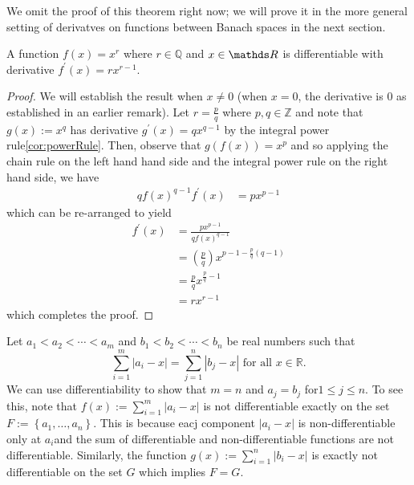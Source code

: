 We omit the proof of this theorem right now; we will prove it in the
more general setting of derivatves on functions between Banach spaces
in the next section.
\begin{prop}
\label{prop:rationalPowerRule}A function $f\left(x\right)=x^{r}$
where $r\in\mathds{Q}$ and $x\in\R$ is differentiable with derivative
$f^{\prime}\left(x\right)=rx^{r-1}.$
\end{prop}

\begin{proof}
We will establish the result when $x\neq0$ (when $x=0$, the derivative
is 0 as established in an earlier remark). Let $r=\frac{p}{q}$ where
$p,q\in\mathds{Z}$ and note that $g\left(x\right):=x^{q}$ has derivative
$g^{\prime}\left(x\right)=qx^{q-1}$ by the integral power rule\ref{cor:powerRule}.
Then, observe that $g\left(f\left(x\right)\right)=x^{p}$ and so applying
the chain rule on the left hand hand side and the integral power rule
on the right hand side, we have
\begin{align*}
qf\left(x\right)^{q-1}f^{\prime}\left(x\right) & =px^{p-1}
\end{align*}
which can be re-arranged to yield
\begin{align*}
f^{\prime}\left(x\right) & =\frac{px^{p-1}}{qf\left(x\right)^{q-1}}\\
 & =\left(\frac{p}{q}\right)x^{p-1-\frac{p}{q}\left(q-1\right)}\\
 & =\frac{p}{q}x^{\frac{p}{q}-1}\\
 & =rx^{r-1}
\end{align*}
which completes the proof.
\end{proof}
\begin{example}
\label{exa:isi2013psb2} Let $a_{1}<a_{2}<\cdots<a_{m}$ and $b_{1}<b_{2}<\cdots<b_{n}$
be real numbers such that 
\[
\sum_{i=1}^{m}\left|a_{i}-x\right|=\sum_{j=1}^{n}\left|b_{j}-x\right|\text{ for all }x\in\mathbb{R}.
\]
We can use differentiability to show that $m=n$ and $a_{j}=b_{j}$
for$1\leq j\leq n$. To see this, note that $f\left(x\right):=\sum_{i=1}^{m}\lvert a_{i}-x\rvert$
is not differentiable exactly on the set $F:=\left\{ a_{1},\ldots,a_{n}\right\} .$
This is because eacj component $\lvert a_{i}-x\rvert$ is non-differentiable
only at $a_{i}$and the sum of differentiable and non-differentiable
functions are not differentiable. Similarly, the function $g\left(x\right):=\sum_{i=1}^{n}\lvert b_{i}-x\rvert$
is exactly not differentiable on the set $G$ which implies $F=G$.
\end{example}


